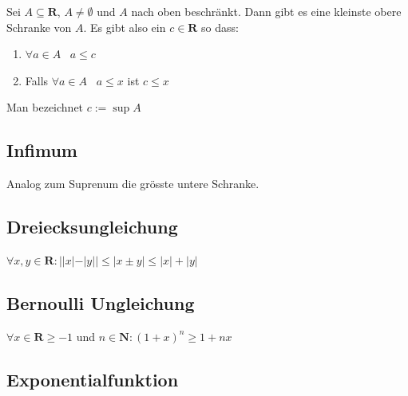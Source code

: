 \documentclass[8pt]{extarticle}
\begin{document}
\begin{multicols*}{3}
Sei $A \subseteq \mathbf{R}$, $ A \neq \emptyset$ und $A$ nach oben beschränkt. Dann gibt es
eine kleinste obere Schranke von $A$. Es gibt also ein $c \in \mathbf{R}$ so dass:
\begin{enumerate}
  \item $\forall a \in A \; \; \; a \leq c$
  \item Falls $\forall a \in A \; \; \; a \leq x$ ist $c \leq x$
\end{enumerate}
Man bezeichnet $c := \sup A$ 

\subsection{Infimum}

Analog zum Suprenum die grösste untere Schranke.

\subsection{Dreiecksungleichung}

\begin{center}
  $\forall x, y \in \mathbf{R} : ||x| - |y|| \leq |x \pm y| \leq |x| + |y|$
\end{center}

\subsection{Bernoulli Ungleichung}

\begin{center}
  $ \forall x \in \mathbf{R} \geq -1$ und $n \in \mathbf{N}: (1 + x)^{n} \geq 1 + nx$
\end{center}

\subsection{Exponentialfunktion}


\end{multicols*}
\end{document}
